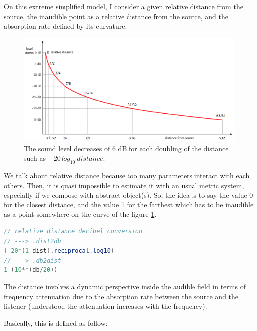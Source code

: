\documentclass{book}
\begin{document}
\bigskip

On this extreme simplified model, I consider a given relative distance from the source, the inaudible point as a relative distance from the source, and the absorption rate defined by its curvature.

\begin{figure}[H]
\begin{center}
\includegraphics[width=\textwidth]{img/6355}
\caption{The sound level decreases of 6 dB for each doubling of the distance such as $-20\,log_{10}\: distance$.
}
\label{fig:dist}
\end{center}
\end{figure}

We talk about relative distance because too many parameters interact with each others. Then, it is quasi impossible to estimate it with an usual metric system, especially if we compose with abstract object(s). So, the idea is to say the value 0 for the closest distance, and the value 1 for the farthest which has to be inaudible as a point somewhere on the curve of the figure \ref{fig:dist}. 

\bigskip

\begin{lstlisting}[basicstyle=\footnotesize\ttfamily,language=java]
// relative distance decibel conversion
// ---> .dist2db
(-20*(1-dist).reciprocal.log10)
// ---> .db2dist
1-(10**(db/20))
\end{lstlisting}

\bigskip

The distance involves a dynamic perspective inside the audible field in terms of frequency attenuation due to the absorption rate between the source and the listener (understood the attenuation increases with the frequency). 

Basically, this is defined as follow:

\bigskip
\end{document}
